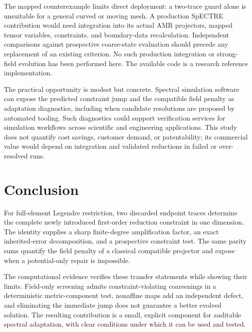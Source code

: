 \documentclass[11pt,a4paper]{article}
\theoremstyle{remark}\newtheorem{remark}[theorem]{Remark}
\begin{document}
The mapped counterexample limits direct deployment: a two-trace guard
alone is unsuitable for a general curved or moving mesh. A production
SpECTRE contribution would need integration into its actual AMR
projectors, mapped tensor variables, constraints, and boundary-data
recalculation. Independent comparisons against prospective coarse-state
evaluation should precede any replacement of an existing criterion.
No such production integration or strong-field evolution has been performed
here. The available code is a research reference implementation.

The practical opportunity is modest but concrete. Spectral simulation
software can expose the predicted constraint jump and the compatible field
penalty as adaptation diagnostics, including when candidate resolutions
are proposed by automated tooling. Such diagnostics could support
verification services for simulation workflows across scientific and
engineering applications. This study does not quantify cost savings,
customer demand, or patentability; its commercial value would depend on
integration and validated reductions in failed or over-resolved runs.

\section{Conclusion}
For full-element Legendre restriction, two discarded endpoint traces
determine the complete newly introduced first-order reduction constraint
in one dimension. The identity supplies a sharp finite-degree
amplification factor, an exact inherited-error decomposition, and a
prospective constraint test. The same parity sums quantify the field
penalty of a classical compatible projector and expose when a
potential-only repair is impossible.

The computational evidence verifies these transfer statements while
showing their limits. Field-only screening admits constraint-violating
coarsenings in a deterministic metric-component test, nonaffine maps add
an independent defect, and eliminating the immediate jump does not
guarantee a better evolved solution. The resulting contribution is a
small, explicit component for auditable spectral adaptation, with clear
conditions under which it can be used and tested.
\end{document}
